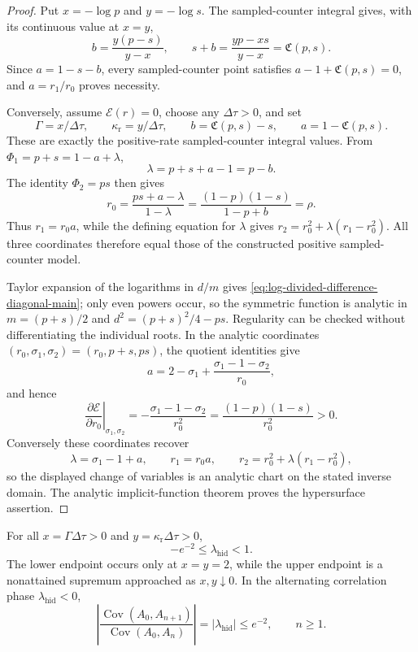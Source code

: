 \begin{proof}
Put \(x=-\log p\) and \(y=-\log s\).  The sampled-counter integral gives,
with its continuous value at \(x=y\),
\[
b=\frac{y(p-s)}{y-x},
\qquad
s+b=\frac{yp-xs}{y-x}=\mathfrak C(p,s).
\]
Since \(a=1-s-b\), every sampled-counter point satisfies
\(a-1+\mathfrak C(p,s)=0\), and \(a=r_1/r_0\) proves necessity.

Conversely, assume \(\mathcal E(r)=0\), choose any
\(\Delta\tau>0\), and set
\[
\Gamma=x/\Delta\tau,
\qquad \kappa_{\mathrm r}=y/\Delta\tau,
\qquad b=\mathfrak C(p,s)-s,
\qquad a=1-\mathfrak C(p,s).
\]
These are exactly the positive-rate sampled-counter integral values.  From
\(\Phi_1=p+s=1-a+\lambda\),
\[
\lambda=p+s+a-1=p-b.
\]
The identity \(\Phi_2=ps\) then gives
\[
r_0=\frac{ps+a-\lambda}{1-\lambda}
=\frac{(1-p)(1-s)}{1-p+b}=\rho.
\]
Thus \(r_1=r_0a\), while the defining equation for \(\lambda\) gives
\(r_2=r_0^2+\lambda(r_1-r_0^2)\).  All three coordinates therefore equal
those of the constructed positive sampled-counter model.

Taylor expansion of the logarithms in \(d/m\) gives
\eqref{eq:log-divided-difference-diagonal-main}; only even powers occur, so
the symmetric function is analytic in
\(m=(p+s)/2\) and \(d^2=(p+s)^2/4-ps\).  Regularity can be checked without
differentiating the individual roots.  In the analytic coordinates
\((r_0,\sigma_1,\sigma_2)=(r_0,p+s,ps)\), the quotient identities give
\[
a=2-\sigma_1+\frac{\sigma_1-1-\sigma_2}{r_0},
\]
and hence
\[
\left.\frac{\partial\mathcal E}{\partial r_0}
\right|_{\sigma_1,\sigma_2}
=-\frac{\sigma_1-1-\sigma_2}{r_0^2}
=\frac{(1-p)(1-s)}{r_0^2}>0.
\]
Conversely these coordinates recover
\[
\lambda=\sigma_1-1+a,
\qquad r_1=r_0a,
\qquad r_2=r_0^2+\lambda(r_1-r_0^2),
\]
so the displayed change of variables is an analytic chart on the stated
inverse domain.  The analytic implicit-function theorem proves the
hypersurface assertion.
\end{proof}

\begin{proposition}
\label{prop:sharp-hidden-mode-range-main}
For all \(x=\Gamma\Delta\tau>0\) and
\(y=\kappa_{\mathrm r}\Delta\tau>0\),
\[
-e^{-2}\le\lambda_{\mathrm{hid}}<1.
\]
The lower endpoint occurs only at \(x=y=2\), while the upper endpoint is a
nonattained supremum approached as \(x,y\downarrow0\).  In the alternating
correlation phase \(\lambda_{\mathrm{hid}}<0\),
\[
\left|\frac{\operatorname{Cov}(A_0,A_{n+1})}
{\operatorname{Cov}(A_0,A_n)}\right|
=|\lambda_{\mathrm{hid}}|\le e^{-2},\qquad n\ge1.
\]
\end{proposition}

